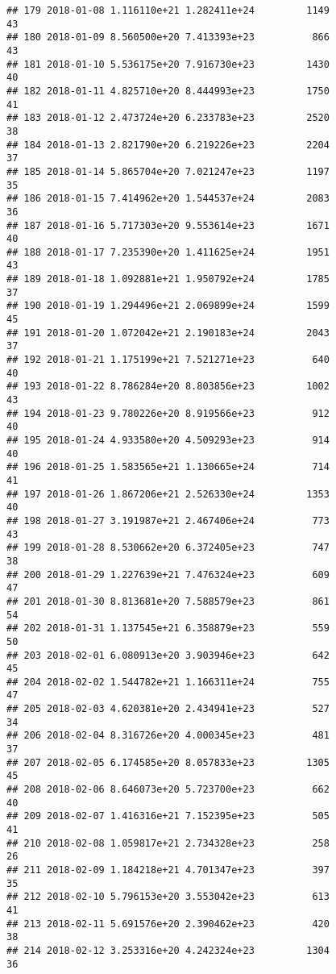 \documentclass[]{article}
\begin{document}
\begin{verbatim}
## 179 2018-01-08 1.116110e+21 1.282411e+24         1149              43
## 180 2018-01-09 8.560500e+20 7.413393e+23          866              43
## 181 2018-01-10 5.536175e+20 7.916730e+23         1430              40
## 182 2018-01-11 4.825710e+20 8.444993e+23         1750              41
## 183 2018-01-12 2.473724e+20 6.233783e+23         2520              38
## 184 2018-01-13 2.821790e+20 6.219226e+23         2204              37
## 185 2018-01-14 5.865704e+20 7.021247e+23         1197              35
## 186 2018-01-15 7.414962e+20 1.544537e+24         2083              36
## 187 2018-01-16 5.717303e+20 9.553614e+23         1671              40
## 188 2018-01-17 7.235390e+20 1.411625e+24         1951              43
## 189 2018-01-18 1.092881e+21 1.950792e+24         1785              37
## 190 2018-01-19 1.294496e+21 2.069899e+24         1599              45
## 191 2018-01-20 1.072042e+21 2.190183e+24         2043              37
## 192 2018-01-21 1.175199e+21 7.521271e+23          640              40
## 193 2018-01-22 8.786284e+20 8.803856e+23         1002              43
## 194 2018-01-23 9.780226e+20 8.919566e+23          912              40
## 195 2018-01-24 4.933580e+20 4.509293e+23          914              40
## 196 2018-01-25 1.583565e+21 1.130665e+24          714              41
## 197 2018-01-26 1.867206e+21 2.526330e+24         1353              40
## 198 2018-01-27 3.191987e+21 2.467406e+24          773              43
## 199 2018-01-28 8.530662e+20 6.372405e+23          747              38
## 200 2018-01-29 1.227639e+21 7.476324e+23          609              47
## 201 2018-01-30 8.813681e+20 7.588579e+23          861              54
## 202 2018-01-31 1.137545e+21 6.358879e+23          559              50
## 203 2018-02-01 6.080913e+20 3.903946e+23          642              45
## 204 2018-02-02 1.544782e+21 1.166311e+24          755              47
## 205 2018-02-03 4.620381e+20 2.434941e+23          527              34
## 206 2018-02-04 8.316726e+20 4.000345e+23          481              37
## 207 2018-02-05 6.174585e+20 8.057833e+23         1305              45
## 208 2018-02-06 8.646073e+20 5.723700e+23          662              40
## 209 2018-02-07 1.416316e+21 7.152395e+23          505              41
## 210 2018-02-08 1.059817e+21 2.734328e+23          258              26
## 211 2018-02-09 1.184218e+21 4.701347e+23          397              35
## 212 2018-02-10 5.796153e+20 3.553042e+23          613              41
## 213 2018-02-11 5.691576e+20 2.390462e+23          420              38
## 214 2018-02-12 3.253316e+20 4.242324e+23         1304              36

\end{verbatim}
\end{document}
